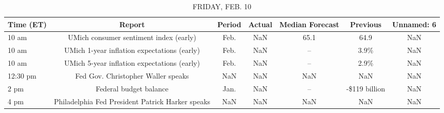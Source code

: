 \documentclass{article}%
\begin{document}
%


\begin{table}[htbp]%
\caption{FRIDAY, FEB. 10}%
\centering%
\begin{adjustbox}{width=1\textwidth}%
\begin{tabular}{lcccccc}
\toprule
Time (ET) &                                           Report & Period & Actual & Median Forecast &      Previous & Unnamed: 6 \\
\midrule
    10 am &           UMich consumer sentiment index (early) &   Feb. &    NaN &            65.1 &          64.9 &        NaN \\
    10 am &      UMich 1-year inflation expectations (early) &   Feb. &    NaN &              -- &          3.9\% &        NaN \\
    10 am &      UMich 5-year inflation expectations (early) &   Feb. &    NaN &              -- &          2.9\% &        NaN \\
 12:30 pm &               Fed Gov. Christopher Waller speaks &    NaN &    NaN &             NaN &           NaN &        NaN \\
     2 pm &                           Federal budget balance &   Jan. &    NaN &              -- & -\$119 billion &        NaN \\
     4 pm & Philadelphia Fed President Patrick Harker speaks &    NaN &    NaN &             NaN &           NaN &        NaN \\
\bottomrule
\end{tabular}
%
\end{adjustbox}%
\end{table}
\end{document}

